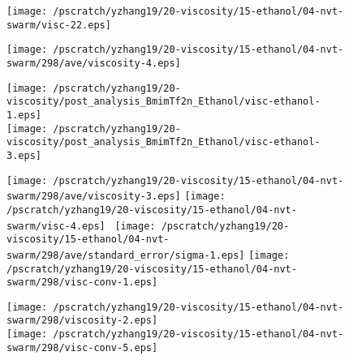 \documentclass[12pt]{article}
\begin{document}
\newpage
\clearpage
\begin{figure}
\begin{center}
\texttt{[image: /pscratch/yzhang19/20-viscosity/15-ethanol/04-nvt-swarm/visc-22.eps]}
\caption{}
\label{fig:ethanol-2ps}
\end{center}
\end{figure}


\newpage
\clearpage
\begin{figure}
\begin{center}
\texttt{[image: /pscratch/yzhang19/20-viscosity/15-ethanol/04-nvt-swarm/298/ave/viscosity-4.eps]}
\caption{}
\label{fig:ethanol-fit}
\end{center}
\end{figure}


\newpage
\clearpage
\begin{figure}
\begin{center}
\texttt{[image: /pscratch/yzhang19/20-viscosity/post\_analysis\_BmimTf2n\_Ethanol/visc-ethanol-1.eps]}
\\
\texttt{[image: /pscratch/yzhang19/20-viscosity/post\_analysis\_BmimTf2n\_Ethanol/visc-ethanol-3.eps]}
\caption{}
\label{fig:ethanol-visc}
\end{center}
\end{figure}



\newpage
\clearpage
\begin{figure}
\begin{center}
\texttt{[image: /pscratch/yzhang19/20-viscosity/15-ethanol/04-nvt-swarm/298/ave/viscosity-3.eps]}
\vspace{0.2in}
\texttt{[image: /pscratch/yzhang19/20-viscosity/15-ethanol/04-nvt-swarm/visc-4.eps]}
\
\texttt{[image: /pscratch/yzhang19/20-viscosity/15-ethanol/04-nvt-swarm/298/ave/standard\_error/sigma-1.eps]}
\vspace{0.2in}
\texttt{[image: /pscratch/yzhang19/20-viscosity/15-ethanol/04-nvt-swarm/298/visc-conv-1.eps]}
\caption{}
\label{fig:ethanol-num}
\end{center}
\end{figure}


\newpage
\clearpage
\begin{figure}
\begin{center}
\texttt{[image: /pscratch/yzhang19/20-viscosity/15-ethanol/04-nvt-swarm/298/viscosity-2.eps]}
\\
\texttt{[image: /pscratch/yzhang19/20-viscosity/15-ethanol/04-nvt-swarm/298/visc-conv-5.eps]}
\caption{}
\label{fig:ethanol-length}
\end{center}
\end{figure}
\end{document}
